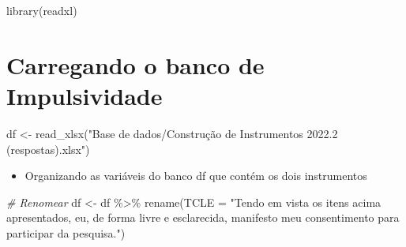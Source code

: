 \documentclass[
]{article}
\newenvironment{Shaded}{\begin{snugshade}}{\end{snugshade}}
\newcommand{\AttributeTok}[1]{\textcolor[rgb]{0.77,0.63,0.00}{#1}}
\newcommand{\CommentTok}[1]{\textcolor[rgb]{0.56,0.35,0.01}{\textit{#1}}}
\newcommand{\FunctionTok}[1]{\textcolor[rgb]{0.00,0.00,0.00}{#1}}
\newcommand{\NormalTok}[1]{#1}
\newcommand{\OtherTok}[1]{\textcolor[rgb]{0.56,0.35,0.01}{#1}}
\newcommand{\SpecialCharTok}[1]{\textcolor[rgb]{0.00,0.00,0.00}{#1}}
\newcommand{\StringTok}[1]{\textcolor[rgb]{0.31,0.60,0.02}{#1}}
\providecommand{\tightlist}{%
  \setlength{\itemsep}{0pt}\setlength{\parskip}{0pt}}
\begin{document}
\begin{Shaded}
\begin{Highlighting}[]
\FunctionTok{library}\NormalTok{(readxl)}
\end{Highlighting}
\end{Shaded}

\hypertarget{carregando-o-banco-de-impulsividade}{%
\section{Carregando o banco de
Impulsividade}\label{carregando-o-banco-de-impulsividade}}

\begin{Shaded}
\begin{Highlighting}[]
\NormalTok{df }\OtherTok{\textless{}{-}} \FunctionTok{read\_xlsx}\NormalTok{(}\StringTok{"Base de dados/Construção de Instrumentos 2022.2 (respostas).xlsx"}\NormalTok{)}
\end{Highlighting}
\end{Shaded}

\begin{itemize}
\tightlist
\item
  Organizando as variáveis do banco df que contém os dois instrumentos
\end{itemize}

\begin{Shaded}
\begin{Highlighting}[]
\CommentTok{\# Renomear}
\NormalTok{df }\OtherTok{\textless{}{-}}\NormalTok{ df }\SpecialCharTok{\%\textgreater{}\%} \FunctionTok{rename}\NormalTok{(}\AttributeTok{TCLE =} \StringTok{"Tendo em vista os itens acima apresentados, eu, de forma livre e esclarecida, manifesto meu consentimento para participar da pesquisa."}\NormalTok{)}
\end{Highlighting}
\end{Shaded}

\begin{Shaded}
\end{Shaded}
\end{document}
